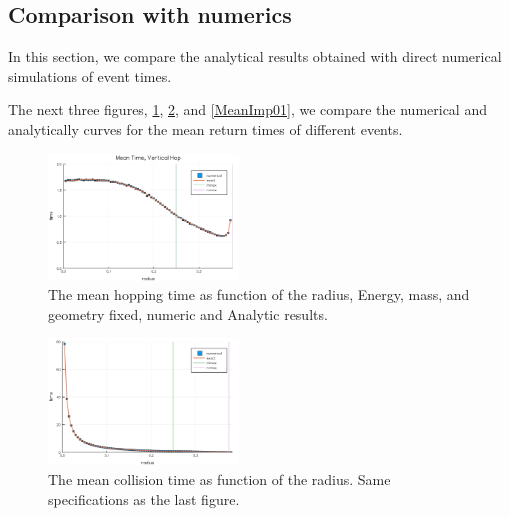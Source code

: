 \documentclass[superscriptaddress,pre,reprint,showpacs,onecolumn]{revtex4-1}
\begin{document}


\subsection{Comparison with numerics}

In this section, we compare the analytical results obtained with direct numerical simulations of
event times.



The next three figures, \ref{MeanHopp01}, \ref{MeanCol01}, and \ref{MeanImp01},  
we compare the
numerical and analytically curves for the mean return times of different events.

\begin{figure}[h]
  \centering
  \includegraphics[width=0.45\textwidth]{./figures/VertHop01.png}
  \caption{The mean hopping time as function of the radius, Energy, mass, 
and geometry fixed, numeric and Analytic results.}\label{MeanHopp01}
\end{figure}

\begin{figure}[h]
  \centering
  \includegraphics[width=0.45\textwidth]{./figures/DiscCollitions01.png}
  \caption{The mean collision time as function of the radius. Same
    specifications as the last figure. }\label{MeanCol01}
\end{figure}
\end{document}
